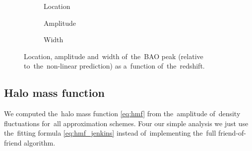 \begin{figure}[tbp]
\newcommand{\corrwidth}{0.70}
\centering
	\begin{subfigure}{\corrwidth\textwidth}
	\end{subfigure}
	\begin{subfigure}{\corrwidth\textwidth}
		\centering
		\caption{Location}
	\end{subfigure}
	\begin{subfigure}{\corrwidth\textwidth}
		\centering
		\caption{Amplitude}
	\end{subfigure}
	\begin{subfigure}{\corrwidth\textwidth}
		\centering
		\caption{Width}
	\end{subfigure}
	\caption{Location, amplitude and~width of~the~BAO peak (relative to~the~non-linear prediction) as a~function of~the~redshift.}
	\label{fig:corr_peak}
\end{figure}

\subsection{Halo mass function}
We computed the~halo mass function \eqref{eq:hmf} from the~amplitude of~density fluctuations for~all approximation schemes. Four our simple analysis we just use the~fitting formula \eqref{eq:hmf_jenkins} instead of~implementing the~full friend-of-friend algorithm.

